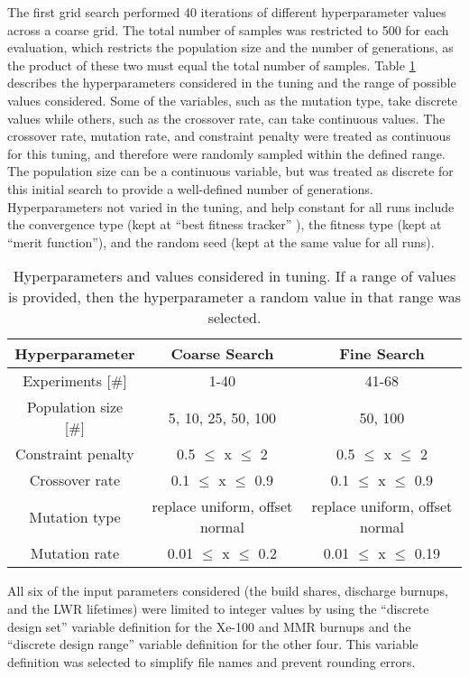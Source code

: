 The 
first grid search performed 40 iterations of different hyperparameter 
values across a coarse grid. The total number of samples was restricted to 
500 for each evaluation, which restricts the population size and the 
number of generations, as the product of these two must equal the 
total number of samples. Table \ref{tab:soga_tuning} describes 
the hyperparameters considered in the tuning and the range of possible 
values considered. Some of the variables, such as the mutation 
type, take discrete values while others, such as the crossover 
rate, can take continuous values. The crossover rate, mutation 
rate, and constraint penalty were treated as continuous for this 
tuning, and therefore were randomly sampled within the defined range. 
The population size can be a continuous variable, but was 
treated as discrete for this initial search to provide a well-defined 
number of generations. Hyperparameters not varied in the tuning, and 
help constant for all runs include the convergence type (kept at
``best fitness tracker'' ), the fitness type (kept at ``merit function''),
and the random seed (kept at the same value for all runs).

\begin{table}
    \centering 
    \caption{Hyperparameters and values considered in tuning. If a range 
    of values is provided, then the hyperparameter a random value in 
    that range was selected.}
    \label{tab:soga_tuning}
    \begin{tabular}{c c c}
        \hline
        Hyperparameter & Coarse Search & Fine Search \\
        \hline 
        Experiments [\#] & 1-40 & 41-68 \\
        Population size [\#] & 5, 10, 25, 50, 100 & 50, 100\\
        Constraint penalty & 0.5 $\leq$ x $\leq$ 2 & 0.5 $\leq$ x $\leq$ 2\\
        Crossover rate & 0.1 $\leq$ x $\leq$ 0.9 & 0.1 $\leq$ x $\leq$ 0.9\\
        Mutation type & replace uniform, offset normal & replace uniform, offset normal\\
        Mutation rate & 0.01 $\leq$ x $\leq$ 0.2 & 0.01 $\leq$ x $\leq$ 0.19\\
        \hline       
    \end{tabular}
\end{table}

All six of the input parameters considered (the build shares, discharge burnups, 
and the \gls{LWR} lifetimes) were limited to integer
values by using the ``discrete design set'' variable definition for the 
Xe-100 and \gls{MMR} burnups and the ``discrete design range'' variable 
definition for the other four. This variable definition was selected to 
simplify file names and prevent rounding errors.

